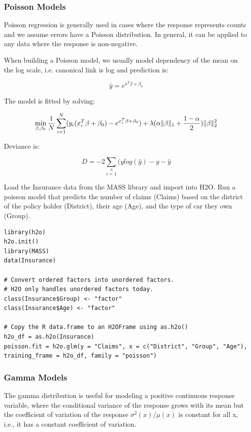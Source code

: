 \subsubsection{Poisson Models}
Poisson regression is generally used in cases where the response represents counts and we assume errors have a
Poisson distribution. In general, it can be applied to any data where the response is non-negative.

When building a Poisson model, we usually model dependency of the mean on the log scale, i.e. canonical link is log
and prediction is:

\[\hat{y} = e^{x^T\beta + \beta_0}\]

The model is fitted by solving:

\[  \min\limits_{\beta,\beta_0} { {1 \over N}\sum\limits_{i=1}\limits^{N}(y_i (x_i^{T}\beta  + \beta_0) - e^{x_i^{T}\beta  + \beta_0})  + \lambda (\alpha \|\beta \|_1 + {1-\alpha \over 2}) \| \beta \|_2^2} \]

Deviance is:

\[D = -2\sum\limits_{i=1}\limits^{N}{(y log(\hat{y}) - y - \hat{y}}\]

\waterExampleInR

Load the Insurance data from the MASS library and import into H2O. Run a poisson model that predicts the number of
claims (Claims) based on the district of the policy holder (District), their age (Age), and the type of car they
own (Group).

\begin{lstlisting}[style=R]
library(h2o)
h2o.init()
library(MASS)
data(Insurance)

# Convert ordered factors into unordered factors.
# H2O only handles unordered factors today.
class(Insurance$Group) <- "factor"
class(Insurance$Age) <- "factor"

# Copy the R data.frame to an H2OFrame using as.h2o()
h2o_df = as.h2o(Insurance)
poisson.fit = h2o.glm(y = "Claims", x = c("District", "Group", "Age"), training_frame = h2o_df, family = "poisson")
\end{lstlisting}

\subsubsection{Gamma Models}
The gamma distribution is useful for modeling a positive continuous response variable, where the conditional
variance of the response grows with its mean but the coefficient of variation of the response $\sigma^2(x)/μ(x)$ is
constant for all x, i.e., it has a constant coefficient of variation.

